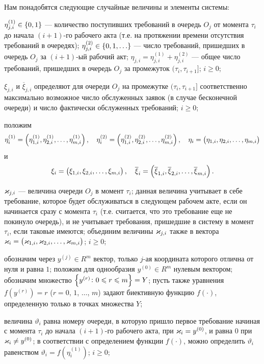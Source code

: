 \documentclass[a4paper,14pt,russian]{article}
\begin{document}
Нам понадобятся следующие случайные величины и элементы системы:

$\eta_{j,i}^{(1)} \in \left\{0,1\right\}$ --- количество поступивших требований в очередь $O_j$ от момента $\tau_i$ до начала $(i+1)$-го рабочего акта 
(т.е. на протяжении времени отсутствия требований в очередях); $\eta_{j,i}^{(2)} \in \left\{0,1,\ldots\right\}$ --- число требований, пришедших в очередь $O_j$ за $(i+1)$-ый рабочий акт; $ \eta_{j,i} = \eta_{j,i}^{(1)}+\eta_{j,i}^{(2)}$ --- общее число требований, пришедших в очередь $O_j$ за промежуток $(\tau_i,\tau_{i+1}]$; $i \geqslant 0$;

$\xi_{j,i}$ и $\overline{\xi}_{j,i}$ определяют для очереди $O_j$ на промежутке $(\tau_i,\tau_{i+1}]$ соответственно  максимально возможное число обслуженных заявок (в случае бесконечной очереди) и число фактически обслуженных требований; $i \geqslant 0$;

положим  
\begin{equation*}
\eta_i^{(1)} = \left(\eta_{1,i}^{(1)}, \eta_{2,i}^{(1)}, \ldots, \eta_{m,i}^{(1)}\right), \quad
\eta_i^{(2)} = \left(\eta_{1,i}^{(2)}, \eta_{2,i}^{(2)}, \ldots, \eta_{m,i}^{(2)}\right), \quad
\eta_i = \left(\eta_{1,i}, \eta_{2,i}, \ldots, \eta_{m,i}\right)
\end{equation*}
и
\begin{equation*}
\xi_i = \left(\xi_{1,i}, \xi_{2,i}, \ldots, \xi_{m,i}\right), \quad \overline{\xi}_i = \left(\overline{\xi}_{1,i}, \overline{\xi}_{2,i}, \ldots, \overline{\xi}_{m,i}\right).
\end{equation*}

$\varkappa_{j,i}$ --- величина очереди $O_j$ в момент $\tau_i$; данная величина учитывает в себе требование, которое будет обслуживаться в следующем рабочем акте, если он начинается сразу с момента $\tau_i$ (т.е. считается, что это требование еще не покинуло очередь), и не учитывает требования, пришедшие в систему в момент $\tau_i$, если таковые имеются; объединим величины $\varkappa_{j,i}$ также в вектора $\varkappa_{i} = \left(\varkappa_{1,i}, \varkappa_{2,i}, \ldots, \varkappa_{m,i}\right)$; $i \geqslant 0$;

обозначим через $y^{(j)}\in R^m$ вектор, только $j$-ая координата которого отлична от нуля и равна $1$; положим для однообразия $y^{(0)}\in R^m$ нулевым вектором; обозначим множество $\left\{y^{(r)} \colon 0 \leqslant r \leqslant m\right\} = Y$; пусть также уравнения $f(y^{(r)}) = r$ ($r=0$, $1$, $\ldots$, $m$) задают биективную функцию $f(\cdot)$, определенную только в точках множества $Y$;

величина $\vartheta_i$ равна номеру очереди, в которую пришло первое требование начиная с момента $\tau_i$ до начала $(i+1)$-го рабочего акта, при $\varkappa_i = y^{(0)}$, и равна $0$ при $\varkappa_i \neq y^{(0)}$; в соответствии с определением функции $f(\cdot)$, можно определить $\vartheta_i$ равенством $\vartheta_i = f(\eta_{i}^{(1)})$; $i \geqslant 0$; 
\end{document}
